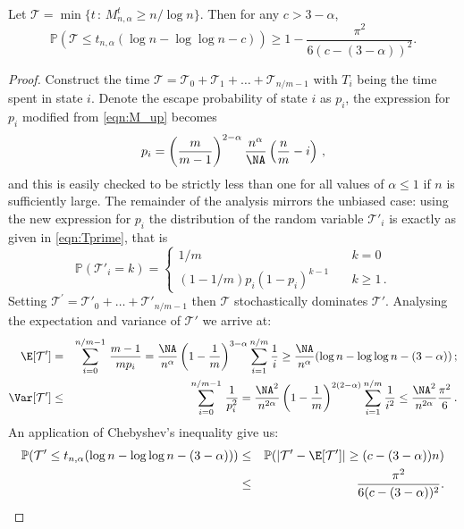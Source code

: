 \documentclass[11pt]{report}
\begin{document}
\begin{lemma}
	\label{chpt5:lem:smallalphalowerbound}
	Let $\mathcal{T} = \min \{t \, : \, M_{n,\alpha}^{t} \geq n / \log n\}$. Then for any $c>3-\alpha$,
	\[\mathbb{P}(\mathcal{T} \leq t_{n,\alpha}(\log n - \log \log n - c)) \geq 1 - \frac{\pi^{2}}{6(c -(3-\alpha))^{2}}.\]
\end{lemma}


\begin{proof}
	Construct the time $\mathcal{T} = \mathcal{T}_{0} + \mathcal{T}_{1} + \ldots + \mathcal{T}_{n/m -1}$ with $T_{i}$ being the time spent in state $i$. Denote the escape probability of state $i$ as $p_{i}$, the expression for $p_i$ modified from \eqref{eqn:M_up} becomes 
	\[ p_i = \left(\frac{m}{m-1}\right)^{2-\alpha}\frac{n^\alpha}{\NA} \left( \frac nm-i\right) \,, \]
	and this is easily checked to be strictly less than one for all values of $\alpha \le 1$ if  $n$ is sufficiently large.
	The remainder of the analysis mirrors the unbiased case: using the new expression for $p_i$ the distribution of the random variable $\mathcal T'_i$ is exactly as given in \eqref{eqn:Tprime}, that is
	\begin{equation*}
	\mathbb P(\mathcal T'_i = k) = \begin{cases}
	1/m &\quad k=0 \\
	(1-1/m)p_i(1-p_i)^{k-1} &\quad k\ge 1\,.
	\end{cases}
	\end{equation*}
	Setting $\mathcal{T}^{'} = \mathcal T'_0 + \ldots + \mathcal T'_{n/m -1}$ then $\mathcal{T}$ stochastically dominates $\mathcal T'$. Analysing the expectation and variance of $\mathcal T'$ we arrive at: 
	\begin{eqnarray*}
		\E[\mathcal{T}^{\prime}]  & = &
		\sum_{i=0}^{n/m-1} \,
		\frac{m-1}{mp_i} = \frac{\NA}{n^{\alpha}}\left(1 - \frac{1}{m}\right)^{3-\alpha}  \sum_{i=1}^{n/m} \frac{1}{i} \ge  \frac{\NA}{n^\alpha}(\log n  -\log \log n -(3-\alpha)) \,;\\
		\Var[\mathcal{T}^{\prime}] & \le &  \sum_{i=0}^{n/m-1} \, \frac{1}{p_i^2}  = \frac{\NA^2}{n^{2\alpha}} \left(1 - \frac{1}{m}\right)^{2(2-\alpha)}\sum_{i=1}^{n/m} \frac{1}{i^{2}}\le 
		\frac{\NA^2}{n^{2\alpha}} \frac{\pi^{2}}{6} \,.
	\end{eqnarray*}
	An application of Chebyshev's inequality give us:
	\begin{eqnarray*}
		\mathbb{P}(\mathcal T' \leq t_{n,\alpha}(\log n -\log \log n -(3-\alpha))) &\leq &\mathbb{P}(|\mathcal T' - \E[\mathcal T']| \geq (c- (3-\alpha))n)\\
		& \leq & \frac{\pi^{2}}{6(c - (3-\alpha))^{2}} .
	\end{eqnarray*}
\end{proof}
\end{document}
